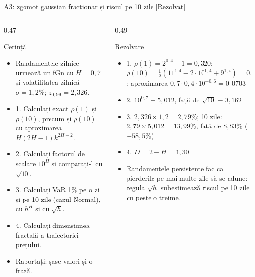 \begin{frame}{A3: zgomot gaussian fracționar și riscul pe 10 zile [Rezolvat]}
\itemsize{\scriptsize}
\begin{columns}[T]
\begin{column}{0.47\textwidth}
\begin{block}{Cerință}
\begin{itemize}
    \item Randamentele zilnice urmează un fGn cu $H = 0{,}7$ și volatilitatea zilnică $\sigma = 1{,}2\%$; $z_{0{,}99} = 2{,}326$.
    \item 1. Calculați exact $\rho(1)$ și $\rho(10)$, precum și $\rho(10)$ cu aproximarea $H(2H - 1)k^{2H - 2}$.
    \item 2. Calculați factorul de scalare $10^H$ și comparați-l cu $\sqrt{10}$.
    \item 3. Calculați VaR 1\% pe o zi și pe 10 zile (cazul Normal), cu $h^H$ și cu $\sqrt{h}$.
    \item 4. Calculați dimensiunea fractală a traiectoriei prețului.
    \item Raportați: șase valori și o frază.
\end{itemize}
\end{block}
\end{column}
\begin{column}{0.49\textwidth}
\begin{exampleblock}{Rezolvare}
\begin{itemize}
    \item 1. $\rho(1) = 2^{0{,}4} - 1 = 0{,}320$; $\rho(10) = \tfrac12(11^{1{,}4} - 2 \cdot 10^{1{,}4} + 9^{1{,}4}) = 0{,}0704$; aproximarea $0{,}7 \cdot 0{,}4 \cdot 10^{-0{,}6} = 0{,}0703$
    \item 2. $10^{0{,}7} = 5{,}012$, față de $\sqrt{10} = 3{,}162$
    \item 3. $2{,}326 \times 1{,}2 = 2{,}79\%$; 10 zile: $2{,}79 \times 5{,}012 = 13{,}99\%$, față de $8{,}83\%$ ($+58{,}5\%$)
    \item 4. $D = 2 - H = 1{,}30$
    \item Randamentele persistente fac ca pierderile pe mai multe zile să se adune: regula $\sqrt{h}$ subestimează riscul pe 10 zile cu peste o treime.
\end{itemize}
\end{exampleblock}
\end{column}
\end{columns}
\end{frame}

